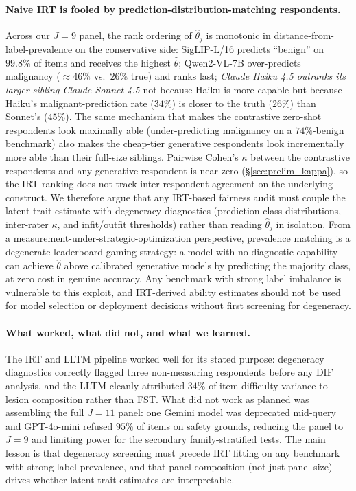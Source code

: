 \documentclass{article}
\begin{document}
\paragraph{Naive IRT is fooled by prediction-distribution-matching respondents.}
Across our $J = 9$ panel, the rank ordering of $\hat\theta_j$ is monotonic in distance-from-label-prevalence on the conservative side: SigLIP-L/16 predicts ``benign'' on $99.8\%$ of items and receives the highest $\hat\theta$; Qwen2-VL-7B over-predicts malignancy ($\approx 46\%$ vs.\ $26\%$ true) and ranks last; \emph{Claude Haiku 4.5 outranks its larger sibling Claude Sonnet 4.5} not because Haiku is more capable but because Haiku's malignant-prediction rate ($34\%$) is closer to the truth ($26\%$) than Sonnet's ($45\%$). The same mechanism that makes the contrastive zero-shot respondents look maximally able (under-predicting malignancy on a $74\%$-benign benchmark) also makes the cheap-tier generative respondents look incrementally more able than their full-size siblings. Pairwise Cohen's $\kappa$ between the contrastive respondents and any generative respondent is near zero (\S\ref{sec:prelim_kappa}), so the IRT ranking does not track inter-respondent agreement on the underlying construct. We therefore argue that any IRT-based fairness audit must couple the latent-trait estimate with degeneracy diagnostics (prediction-class distributions, inter-rater $\kappa$, and infit/outfit thresholds) rather than reading $\hat\theta_j$ in isolation. From a measurement-under-strategic-optimization perspective, prevalence matching is a degenerate leaderboard gaming strategy: a model with no diagnostic capability can achieve $\hat\theta$ above calibrated generative models by predicting the majority class, at zero cost in genuine accuracy. Any benchmark with strong label imbalance is vulnerable to this exploit, and IRT-derived ability estimates should not be used for model selection or deployment decisions without first screening for degeneracy.

\paragraph{What worked, what did not, and what we learned.}
The IRT and LLTM pipeline worked well for its stated purpose: degeneracy diagnostics correctly flagged three non-measuring respondents before any DIF analysis, and the LLTM cleanly attributed $34\%$ of item-difficulty variance to lesion composition rather than FST. What did not work as planned was assembling the full $J = 11$ panel: one Gemini model was deprecated mid-query and GPT-4o-mini refused $95\%$ of items on safety grounds, reducing the panel to $J = 9$ and limiting power for the secondary family-stratified tests. The main lesson is that degeneracy screening must precede IRT fitting on any benchmark with strong label prevalence, and that panel composition (not just panel size) drives whether latent-trait estimates are interpretable.
\end{document}
